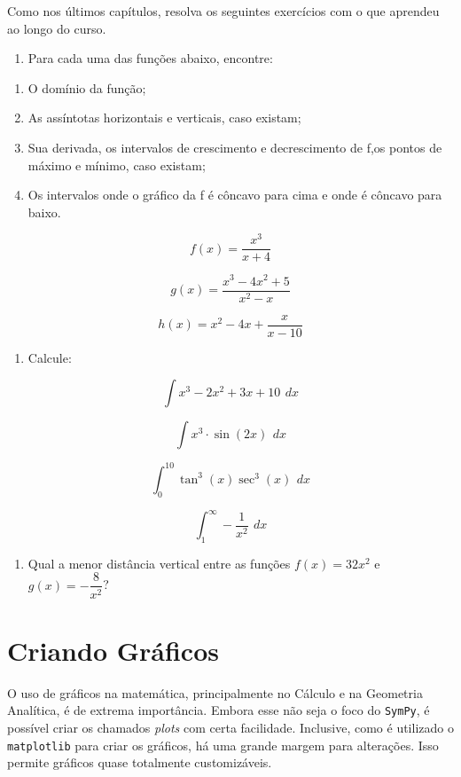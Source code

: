 \documentclass[a4paper, 11pt, brazilian]{article}
\providecommand{\tightlist}{%
      \setlength{\itemsep}{0pt}\setlength{\parskip}{0pt}}
\begin{document}
Como nos últimos capítulos, resolva os seguintes exercícios com o que
aprendeu ao longo do curso.

\begin{enumerate}
\def\labelenumi{\arabic{enumi}.}
\tightlist
\item
  Para cada uma das funções abaixo, encontre:
\end{enumerate}

\begin{enumerate}
\def\labelenumi{\alph{enumi})}
\item
  O domínio da função;
\item
  As assíntotas horizontais e verticais, caso existam;
\item
  Sua derivada, os intervalos de crescimento e decrescimento de f,os
  pontos de máximo e mínimo, caso existam;
\item
  Os intervalos onde o gráfico da f é côncavo para cima e onde é côncavo
  para baixo.
\end{enumerate}

\[f(x) = \dfrac{x^3}{x + 4}\]

\[g(x) = \dfrac{x^3 - 4x^2 + 5}{x^2 - x}\]

\[h(x) = x^2 - 4x + \dfrac{x}{x-10}\]

\begin{enumerate}
\def\labelenumi{\arabic{enumi}.}
\setcounter{enumi}{1}
\tightlist
\item
  Calcule:
\end{enumerate}

\[\int x^3 - 2x^2 + 3x + 10 \,\ dx\]

\[\int x^3\cdot\sin(2x) \,\ dx\]

\[\int_0^{10} \tan^3(x)\sec^3(x) \,\ dx \]

\[\int_1^{\infty} -\dfrac{1}{x^2} \,\ dx \]

\begin{enumerate}
\def\labelenumi{\arabic{enumi}.}
\setcounter{enumi}{2}
\tightlist
\item
  Qual a menor distância vertical entre as funções \(f(x) = 32x^2\) e
  \(g(x) = -\dfrac{8}{x^2}\)?
\end{enumerate}

    \hypertarget{criando-gruxe1ficos}{%
\section{Criando Gráficos}\label{criando-gruxe1ficos}}

O uso de gráficos na matemática, principalmente no Cálculo e na
Geometria Analítica, é de extrema importância. Embora esse não seja o
foco do \texttt{SymPy}, é possível criar os chamados \emph{plots} com
certa facilidade. Inclusive, como é utilizado o \texttt{matplotlib} para
criar os gráficos, há uma grande margem para alterações. Isso permite
gráficos quase totalmente customizáveis.
\end{document}
